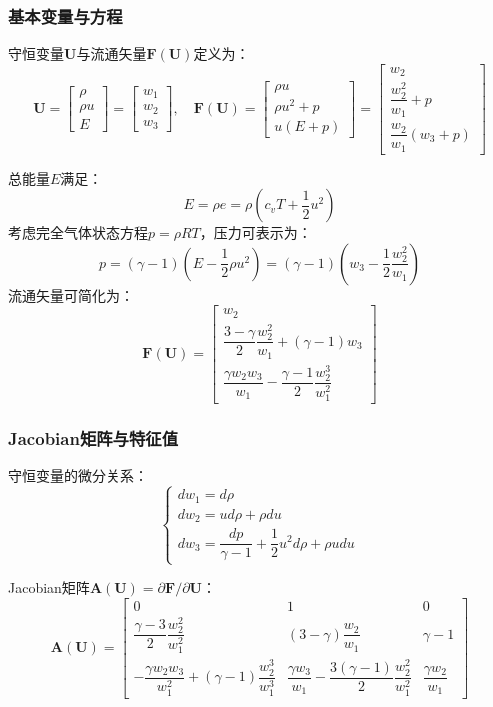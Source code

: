 \documentclass[12pt,a4paper]{article}
\begin{document}
\subsubsection{基本变量与方程}
守恒变量$\mathbf{U}$与流通矢量$\mathbf{F}(\mathbf{U})$定义为：
$$
\mathbf{U} = \begin{bmatrix}
\rho \\
\rho u \\
E
\end{bmatrix} = \begin{bmatrix}
w_{1} \\
w_{2} \\
w_{3}
\end{bmatrix}, \quad
\mathbf{F}(\mathbf{U}) = \begin{bmatrix}
\rho u \\
\rho u^{2} + p \\
u(E + p)
\end{bmatrix} = \begin{bmatrix}
w_{2} \\
\dfrac{w_{2}^{2}}{w_{1}} + p \\
\dfrac{w_{2}}{w_{1}}(w_{3} + p)
\end{bmatrix}
$$

总能量$E$满足：
$$
E = \rho e = \rho\left(c_{v}T + \frac{1}{2}u^{2}\right)
$$
考虑完全气体状态方程$p = \rho RT$，压力可表示为：
$$
p = (\gamma - 1)\left(E - \frac{1}{2}\rho u^{2}\right) = (\gamma - 1)\left(w_{3} - \frac{1}{2}\frac{w_{2}^{2}}{w_{1}}\right)
$$
流通矢量可简化为：
$$
\mathbf{F}(\mathbf{U}) = \begin{bmatrix}
w_{2} \\
\dfrac{3 - \gamma}{2}\dfrac{w_{2}^{2}}{w_{1}} + (\gamma - 1)w_{3} \\
\dfrac{\gamma w_{2}w_{3}}{w_{1}} - \dfrac{\gamma - 1}{2}\dfrac{w_{2}^{3}}{w_{1}^{2}}
\end{bmatrix}
$$

\subsubsection{Jacobian矩阵与特征值}
守恒变量的微分关系：
$$
\begin{cases}
d w_{1} = d \rho \\
d w_{2} = u d \rho + \rho d u \\
d w_{3} = \dfrac{d p}{\gamma - 1} + \dfrac{1}{2}u^{2} d \rho + \rho u d u
\end{cases}
$$

Jacobian矩阵$\mathbf{A}(\mathbf{U}) = \partial \mathbf{F}/\partial \mathbf{U}$：
$$
\mathbf{A}(\mathbf{U}) = \begin{bmatrix}
0 & 1 & 0 \\
\dfrac{\gamma-3}{2}\dfrac{w_{2}^{2}}{w_{1}^{2}} & (3-\gamma)\dfrac{w_{2}}{w_{1}} & \gamma-1 \\
-\dfrac{\gamma w_{2}w_{3}}{w_{1}^{2}} + (\gamma-1)\dfrac{w_{2}^{3}}{w_{1}^{3}} & \dfrac{\gamma w_{3}}{w_{1}} - \dfrac{3(\gamma-1)}{2}\dfrac{w_{2}^{2}}{w_{1}^{2}} & \dfrac{\gamma w_{2}}{w_{1}}
\end{bmatrix}
$$
\end{document}
